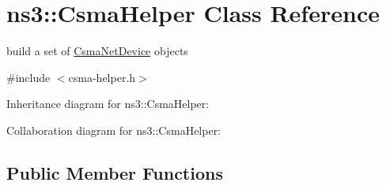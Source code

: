 \hypertarget{classns3_1_1CsmaHelper}{}\section{ns3\+:\+:Csma\+Helper Class Reference}
\label{classns3_1_1CsmaHelper}


build a set of \hyperlink{classns3_1_1CsmaNetDevice}{Csma\+Net\+Device} objects  




{\ttfamily \#include $<$csma-\/helper.\+h$>$}



Inheritance diagram for ns3\+:\+:Csma\+Helper\+:


Collaboration diagram for ns3\+:\+:Csma\+Helper\+:
\subsection*{Public Member Functions}
